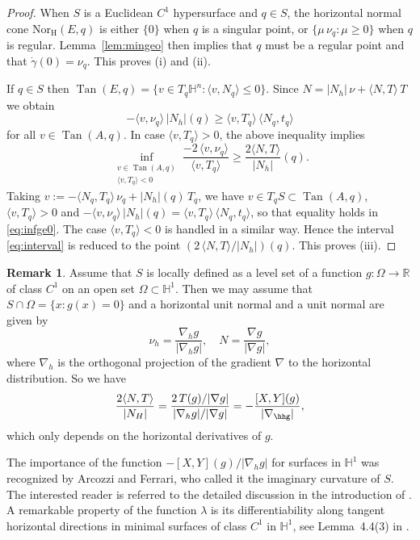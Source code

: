 \documentclass[10pt]{amsart}
\theoremstyle{definition}
\newtheorem{remark}[theorem]{Remark}
\theoremstyle{remark}
\numberwithin{equation}{section}
\begin{document}
\begin{proof}
When $S$ is a Euclidean $C^{1}$ hypersurface and $q\in S$, the horizontal normal cone $\operatorname{Nor_{H}}(E,q)$ is either $\{0\}$ when $q$ is a singular point, or $\{\mu\,\nu_{q}:\mu{\geqslant} 0\}$ when $q$ is regular. Lemma~\ref{lem:mingeo} then implies that $q$ must be a regular point and that ${\dot{\gamma}}(0)=\nu_{q}$. This proves (i) and (ii).

If $q\in S$ then $\operatorname{Tan}(E,q)=\{v\in T_{q}{{\mathbb{H}}}^{n}: {\langle{v,N_{q}}\rangle}{\leqslant} 0\}$. Since $N={|N_{h}|}\,\nu+{\langle{N,T}\rangle}\,T$ we obtain
\[
-{\langle{v,\nu_{q}}\rangle}\,{|N_{h}|}(q){\geqslant} {\langle{v,T_{q}}\rangle}\,{\langle{N_{q},t_{q}}\rangle}
\]
for all $v\in\operatorname{Tan}(A,q)$. In case ${\langle{v,T_{q}}\rangle}>0$, the above inequality implies
\begin{equation}
\label{eq:infge0}
\inf_{\substack{v\in\operatorname{Tan}(A,q) \\ {\langle{v,T_{q}}\rangle}< 0}} \frac{-2\,{\langle{v,\nu_{q}}\rangle}}{{\langle{v,T_{q}}\rangle}}{\geqslant} \frac{2{\langle{N,T}\rangle}}{|N_{h}|}(q).
\end{equation}
Taking $v:=-{\langle{N_{q},T_{q}}\rangle}\,\nu_{q}+{|N_{h}|}(q)\,T_{q}$, we have $v\in T_{q}S\subset \operatorname{Tan}(A,q)$, ${\langle{v,T_{q}}\rangle}>0$ and $-{\langle{v,\nu_{q}}\rangle}\,{|N_{h}|}(q)={\langle{v,T_{q}}\rangle}\,{\langle{N_{q},t_{q}}\rangle}$, so that equality holds in \eqref{eq:infge0}. The case ${\langle{v,T_{q}}\rangle}<0$ is handled in a similar way. Hence the interval \eqref{eq:interval} is reduced to the point $(2\,{\langle{N,T}\rangle}/{|N_{h}|})(q)$. This proves (iii).
\end{proof}

\begin{remark}
Assume that $S$ is locally defined as a level set of a function $g:{\Omega}\to{{\mathbb{R}}}$ of class $C^1$ on an open set ${\Omega}\subset{{\mathbb{H}}}^1$. Then we may assume that $S\cap {\Omega}=\{x : g(x)=0\}$ and a horizontal unit normal and a unit normal are given by
\[
{\nu_{h}}=\frac{\nabla_hg}{|\nabla_hg|},\quad N=\frac{\nabla g}{|\nabla g|},
\]
where $\nabla_h$ is the orthogonal projection of the gradient $\nabla$ to the horizontal distribution. So we have
\[
\frac{2{\langle{N,T}\rangle}}{|N_{H}|}=\frac{2\,T(g)/|\nabla g|}{|\nabla_hg|/|\nabla g|}=-\frac{[X,Y](g)}{|\nabla_\hhg|},
\]
which only depends on the horizontal derivatives of $g$.

The importance of the function $-[X,Y](g)/|\nabla_hg|$ for surfaces in ${{\mathbb{H}}}^1$ was recognized by Arcozzi and Ferrari, who called it the imaginary curvature of $S$. The interested reader is referred to the detailed discussion in the introduction of \cite{MR2386836}. A remarkable property of the function ${\lambda}$ is its differentiability along tangent horizontal directions in minimal surfaces of class $C^1$ in ${{\mathbb{H}}}^1$, see Lemma~4.4(3) in \cite{MR3406514}.
\end{remark}
\end{document}
